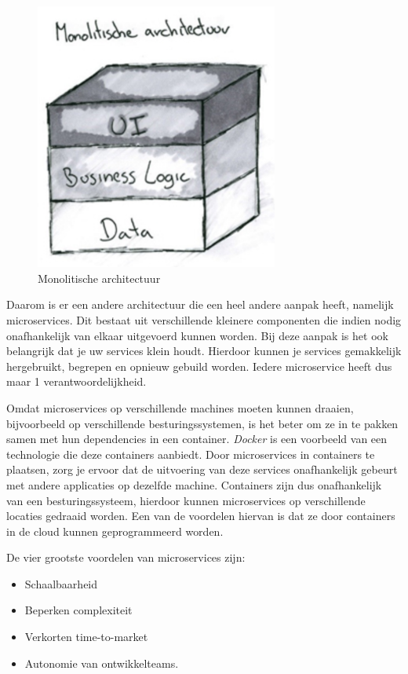 \begin{figure}[h!]
    \centering
    \includegraphics[width=80mm]{../monolith.png}
    \caption{Monolitische architectuur}
        
\end{figure}

Daarom is er een andere architectuur die een heel andere aanpak heeft, namelijk microservices. Dit bestaat uit verschillende kleinere componenten die indien nodig onafhankelijk van elkaar uitgevoerd kunnen worden. Bij deze aanpak is het ook belangrijk dat je uw services klein houdt. Hierdoor kunnen je services gemakkelijk hergebruikt, begrepen en opnieuw gebuild worden. Iedere microservice heeft dus maar 1 verantwoordelijkheid.

Omdat microservices op verschillende machines moeten kunnen draaien, bijvoorbeeld op verschillende besturingssystemen, is het beter om ze in te pakken samen met hun dependencies in een container. \emph{Docker} is een voorbeeld van een technologie die deze containers aanbiedt. Door microservices in containers te plaatsen, zorg je ervoor dat de uitvoering van deze services onafhankelijk gebeurt met andere applicaties op dezelfde machine. Containers zijn dus onafhankelijk van een besturingssysteem, hierdoor kunnen microservices op verschillende locaties gedraaid worden. Een van de voordelen hiervan is dat ze door containers in de cloud kunnen geprogrammeerd worden.

De vier grootste voordelen van microservices zijn: 
\begin{itemize}
    \item Schaalbaarheid
    \item Beperken complexiteit
    \item Verkorten time-to-market
    \item Autonomie van ontwikkelteams.
\end{itemize}



